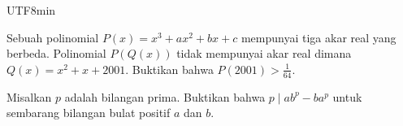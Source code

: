 \documentclass[12pt]{scrartcl}
\begin{document}
\begin{CJK*}{UTF8}{min}
    \begin{soalbaru}
		Sebuah polinomial $P(x)=x^3+ax^2+bx+c$ mempunyai tiga akar real yang berbeda. Polinomial $P(Q(x))$ tidak mempunyai akar real dimana $Q(x)=x^2+x+2001$. Buktikan bahwa $P(2001)>\frac{1}{64}$.
    \end{soalbaru}	

    \begin{soalbaru} 
    Misalkan $p$ adalah bilangan prima. Buktikan bahwa $p \mid ab^p - ba^p$ untuk sembarang bilangan bulat positif $a$ dan $b$.
\end{soalbaru}

\end{CJK*}
\end{document}
